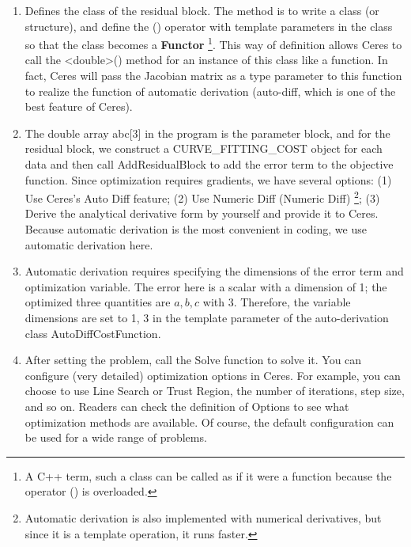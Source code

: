 \begin{enumerate}
    \item Defines the class of the residual block. The method is to write a class (or structure), and define the () operator with template parameters in the class so that the class becomes a \textbf{Functor} \footnote{A C++ term, such a class can be called as if it were a function because the operator () is overloaded. }. This way of definition allows Ceres to call the <double>() method for an instance of this class like a function. In fact, Ceres will pass the Jacobian matrix as a type parameter to this function to realize the function of automatic derivation (auto-diff, which is one of the best feature of Ceres).
    \item The double array abc[3] in the program is the parameter block, and for the residual block, we construct a CURVE\_FITTING\_COST object for each data and then call AddResidualBlock to add the error term to the objective function. Since optimization requires gradients, we have several options: (1) Use Ceres's Auto Diff feature; (2) Use Numeric Diff (Numeric Diff) \footnote{Automatic derivation is also implemented with numerical derivatives, but since it is a template operation, it runs faster. }; (3) Derive the analytical derivative form by yourself and provide it to Ceres. Because automatic derivation is the most convenient in coding, we use automatic derivation here.
    \item Automatic derivation requires specifying the dimensions of the error term and optimization variable. The error here is a scalar with a dimension of 1; the optimized three quantities are $a, b, c$ with 3. Therefore, the variable dimensions are set to 1, 3 in the template parameter of the auto-derivation class AutoDiffCostFunction.
    \item After setting the problem, call the Solve function to solve it. You can configure (very detailed) optimization options in Ceres. For example, you can choose to use Line Search or Trust Region, the number of iterations, step size, and so on. Readers can check the definition of Options to see what optimization methods are available. Of course, the default configuration can be used for a wide range of problems.
\end{enumerate}

